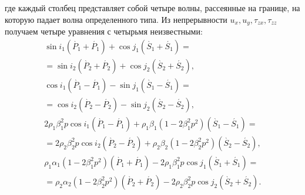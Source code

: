 где каждый столбец представляет собой четыре волны, рассеянные на границе, на которую падает волна определенного типа. Из непрерывности $u_x, u_y, \tau_{zx}, \tau_{zz}$ получаем четыре уравнения с четырьмя неизвестными:
\begin{eqnarray}
\sin{i_1(\grave{P_1} + \acute{P_1})} + \cos{j_1(\grave{S_1} + \acute{S_1})} = \nonumber\\
	= \sin{i_2(\grave{P_2} + \acute{P_2})} + \cos{j_2(\grave{S_2} + \acute{S_2})}, \nonumber\\
\cos{i_1(\grave{P_1} - \acute{P_1})} - \sin{j_1(\grave{S_1} - \acute{S_1})} = \nonumber\\
	= \cos{i_2(\grave{P_2} - \acute{P_2})} - \sin{j_2(\grave{S_2} - \acute{S_2})}, \nonumber\\
2 \rho_1 \beta_1^2 p \cos{i_1(\grave{P_1} - \acute{P_1})} + \rho_1 \beta_1 (1 - 2 \beta_1^2 p^2) (\grave{S_1} - \acute{S_1}) = \nonumber\\
	= 2 \rho_2 \beta_2^2 p \cos{i_2(\grave{P_2} - \acute{P_2})} + \rho_2 \beta_2 (1 - 2 \beta_2^2 p^2) (\grave{S_2} - \acute{S_2}), \nonumber\\
\rho_1 \alpha_1 (1 - 2 \beta_1^2 p^2) (\grave{P_1} + \acute{P_1}) - 2 \rho_1 \beta_1^2 p \cos{j_1(\grave{S_1} + \acute{S_1})} = \nonumber\\
	= \rho_2 \alpha_2 (1 - 2 \beta_2^2 p^2) (\grave{P_2} + \acute{P_2}) - 2 \rho_2 \beta_2^2 p \cos{j_2(\grave{S_2} + \acute{S_2})}.
\end{eqnarray}


